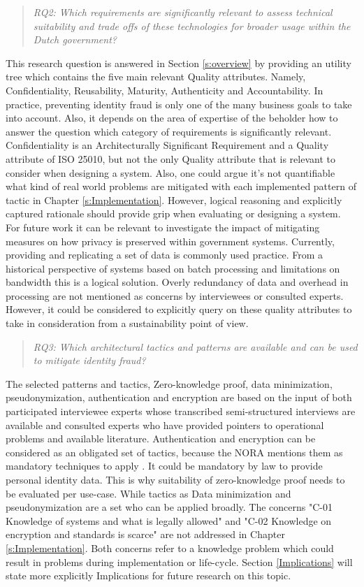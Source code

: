 \begin{quote}\emph{RQ2: Which requirements are significantly relevant to assess technical suitability and trade offs of these technologies for broader usage within the Dutch government?}\end{quote}
This research question is answered in Section \ref{s:overview} by providing an utility tree which contains the five main relevant Quality attributes. Namely, Confidentiality, Reusability, Maturity, Authenticity and Accountability. In practice, preventing identity fraud is only one of the many business goals to take into account. Also, it depends on the area of expertise of the beholder how to answer the question which category of requirements is significantly relevant. Confidentiality is an Architecturally Significant Requirement and a Quality attribute of ISO 25010, but not the only Quality attribute that is relevant to consider when designing a system. Also, one could argue it's not quantifiable what kind of real world problems are mitigated with each implemented pattern of tactic in Chapter \ref{s:Implementation}. However, logical reasoning and explicitly captured rationale should provide grip when evaluating or designing a system. For future work it can be relevant to investigate the impact of mitigating measures on how privacy is preserved within government systems. Currently, providing and replicating a set of data is commonly used practice. From a historical perspective of systems based on batch processing and limitations on bandwidth this is a logical solution. Overly redundancy of data and overhead in processing are not mentioned as concerns by interviewees or consulted experts. However, it could be considered to explicitly query on these quality attributes to take in consideration from a sustainability point of view.

\begin{quote}\emph{RQ3: Which architectural tactics and patterns are available and can be used to mitigate identity fraud?}\end{quote}
The selected patterns and tactics, Zero-knowledge proof, data minimization, pseudonymization, authentication and encryption are based on the input of both participated interviewee experts whose transcribed semi-structured interviews are available and consulted experts who have provided pointers to operational problems and available literature. Authentication and encryption can be considered as an obligated set of tactics, because the NORA mentions them as mandatory techniques to apply \cite{NORA_PasToeOfLegUit}. It could be mandatory by law to provide personal identity data. This is why suitability of zero-knowledge proof needs to be evaluated per use-case. While tactics as Data minimization and pseudonymization are a set who can be applied broadly. The concerns "C-01 Knowledge of systems and what is legally allowed" and "C-02 Knowledge on encryption and standards is scarce" are not addressed in Chapter \ref{s:Implementation}. Both concerns refer to a knowledge problem which could result in problems during implementation or life-cycle. Section \ref{Implications} will state more explicitly Implications for future research on this topic.